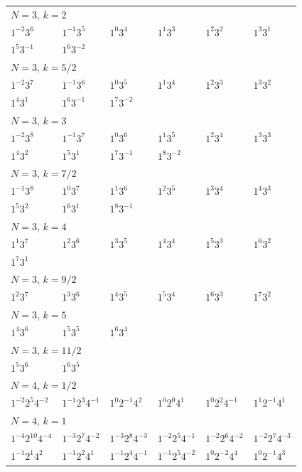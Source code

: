 \documentclass[12pt]{amsart}
\numberwithin{equation}{section}
\theoremstyle{plain}
\theoremstyle{definition}
\theoremstyle{remark}
\begin{document}
\begin{longtable}{llllll}
\midrule
\multicolumn{6}{l}{$N=3$, $k=2$}\\
$1^{-2}3^{6}$ & $1^{-1}3^{5}$ & $1^{0}3^{4}$ & $1^{1}3^{3}$ & $1^{2}3^{2}$ & $1^{3}3^{1}$\\
$1^{5}3^{-1}$ & $1^{6}3^{-2}$ & &&&\\
\midrule
\multicolumn{6}{l}{$N=3$, $k=5/2$}\\
$1^{-2}3^{7}$ & $1^{-1}3^{6}$ & $1^{0}3^{5}$ & $1^{1}3^{4}$ & $1^{2}3^{3}$ & $1^{3}3^{2}$\\
$1^{4}3^{1}$ & $1^{6}3^{-1}$ & $1^{7}3^{-2}$ & &&\\
\midrule
\multicolumn{6}{l}{$N=3$, $k=3$}\\
$1^{-2}3^{8}$ & $1^{-1}3^{7}$ & $1^{0}3^{6}$ & $1^{1}3^{5}$ & $1^{2}3^{4}$ & $1^{3}3^{3}$\\
$1^{4}3^{2}$ & $1^{5}3^{1}$ & $1^{7}3^{-1}$ & $1^{8}3^{-2}$ & &\\
\midrule
\multicolumn{6}{l}{$N=3$, $k=7/2$}\\
$1^{-1}3^{8}$ & $1^{0}3^{7}$ & $1^{1}3^{6}$ & $1^{2}3^{5}$ & $1^{3}3^{4}$ & $1^{4}3^{3}$\\
$1^{5}3^{2}$ & $1^{6}3^{1}$ & $1^{8}3^{-1}$ & &&\\
\midrule
\multicolumn{6}{l}{$N=3$, $k=4$}\\
$1^{1}3^{7}$ & $1^{2}3^{6}$ & $1^{3}3^{5}$ & $1^{4}3^{4}$ & $1^{5}3^{3}$ & $1^{6}3^{2}$\\
$1^{7}3^{1}$ & &&&&\\
\midrule
\multicolumn{6}{l}{$N=3$, $k=9/2$}\\
$1^{2}3^{7}$ & $1^{3}3^{6}$ & $1^{4}3^{5}$ & $1^{5}3^{4}$ & $1^{6}3^{3}$ & $1^{7}3^{2}$\\
\midrule
\multicolumn{6}{l}{$N=3$, $k=5$}\\
$1^{4}3^{6}$ & $1^{5}3^{5}$ & $1^{6}3^{4}$ & &&\\
\midrule
\multicolumn{6}{l}{$N=3$, $k=11/2$}\\
$1^{5}3^{6}$ & $1^{6}3^{5}$ & &&&\\
\midrule
\multicolumn{6}{l}{$N=4$, $k=1/2$}\\
$1^{-2}2^{5}4^{-2}$ & $1^{-1}2^{3}4^{-1}$ & $1^{0}2^{-1}4^{2}$ & $1^{0}2^{0}4^{1}$ & $1^{0}2^{2}4^{-1}$ & $1^{1}2^{-1}4^{1}$\\
\midrule
\multicolumn{6}{l}{$N=4$, $k=1$}\\
$1^{-4}2^{10}4^{-4}$ & $1^{-3}2^{7}4^{-2}$ & $1^{-3}2^{8}4^{-3}$ & $1^{-2}2^{5}4^{-1}$ & $1^{-2}2^{6}4^{-2}$ & $1^{-2}2^{7}4^{-3}$\\
$1^{-1}2^{1}4^{2}$ & $1^{-1}2^{2}4^{1}$ & $1^{-1}2^{4}4^{-1}$ & $1^{-1}2^{5}4^{-2}$ & $1^{0}2^{-2}4^{4}$ & $1^{0}2^{-1}4^{3}$\\

\end{longtable}
\end{document}
